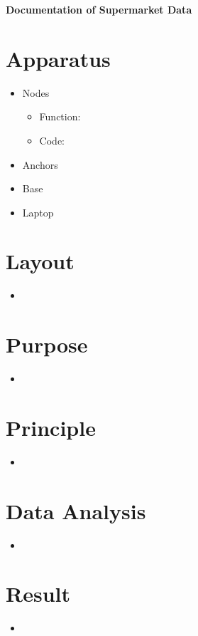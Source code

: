 \documentclass{article}
\begin{document}
\begin{center}
\LARGE \bf{Documentation of Supermarket Data}\\
\end{center}

\section{Apparatus}
\begin{itemize}
\item Nodes
	\begin{itemize}
	\item Function:  
	\item Code: 
	\end{itemize}
\item Anchors
	\begin{}
	\item 
	\item
	\end{}
\item Base
	\begin{}
	\item
	
	\end{}
\item Laptop
	\begin{}
	\item
	
	\end{}
\end{itemize}

\section{Layout}
\begin{itemize}
\item 
\end{itemize}

\section{Purpose}
\begin{itemize}
\item 
\end{itemize}

\section{Principle}
\begin{itemize}
\item 
\end{itemize}

\section{Data Analysis}
\begin{itemize}
\item 
\end{itemize}

\section{Result}
\begin{itemize}
\item 
\end{itemize}
\end{document}
